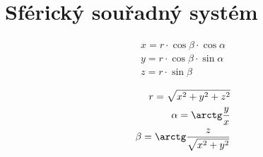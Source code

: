 \section{Sférický souřadný systém}

\begin{equation}
\begin{split}
x = r \cdot \cos \beta \cdot \cos \alpha \\
y = r \cdot \cos \beta \cdot \sin \alpha \\
z = r \cdot \sin \beta
\end{split}
\end{equation}

\begin{equation}
\begin{split}
r = \sqrt{x^2 + y^2 + z^2} \\
\alpha = \arctg \frac{y}{x} \\
\beta = \arctg \frac{z}{\sqrt{x^2 + y^2}}
\end{split}
\end{equation}
